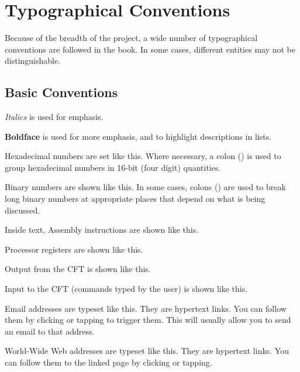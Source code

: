 \chapter{Typographical Conventions}

Because of the breadth of the project, a wide number of typographical
conventions are followed in the book. In some cases, different entities may not
be distinguishable.

\section{Basic Conventions}

\begin{description}

\item {\em Italics\/} is used for emphasis.

\item \textbf{Boldface} is used for more emphasis, and to highlight descriptions
  in lists.

\item {} Hexadecimal numbers are set like this. Where necessary, a
  colon (\hex{:}) is used to group hexadecimal numbers in 16-bit (four digit)
  quantities.

\item {} Binary numbers are shown like this. In some cases,
  colons (\bin{:}) are used to break long binary numbers at appropriate places
  that depend on what is being discussed.

\item {} Inside text, Assembly instructions are shown like this.

\item \AC{} Processor registers are shown like this.

\item {} Output from the CFT is shown like this.

\item {} Input to the CFT (commands typed by the user) is shown like
  this.

\item {} Email addresses are typeset like
  this. They are hypertext links. You can follow them by clicking or tapping to
  trigger them. This will usually allow you to send an email to that address.

\item {} World-Wide Web addresses are typeset like
  this. They are hypertext links. You can follow them to the linked page by
  clicking or tapping.

\end{description}

